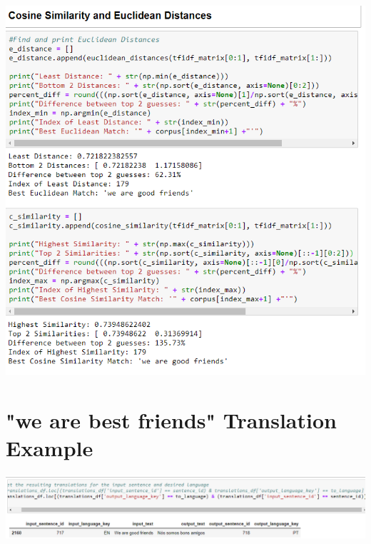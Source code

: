 \documentclass[runningheads]{llncs}
\begin{document}
	\begin{minipage}{\linewidth}
		\begin{center}
			\includegraphics[width=\linewidth]{Friends_Comparison.png}
			\label{fig:Sentence Comparison 1}
			\vspace*{1cm}
		\end{center}
	\end{minipage}
	\afterpage{\clearpage}


\section{"we are best friends" Translation Example}
\hypertarget{Appendix D}{}


	\begin{minipage}{\linewidth}
		\begin{center}
			\includegraphics[width=\linewidth]{Language_Match.png}
			\label{fig:Translating Matched Sentence  to Portuguese}
			\vspace*{1cm}
		\end{center}
	\end{minipage}
	\afterpage{\clearpage}
\end{document}
